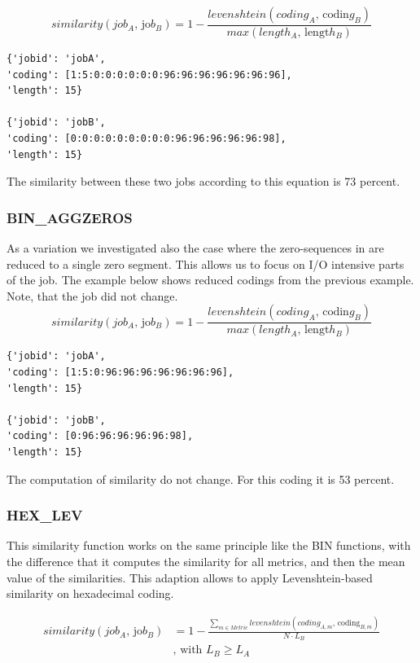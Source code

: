 \documentclass[]{llncs}
\begin{document}
\begin{equation}
similarity \left( job_{A}\text{, jo}b_{B} \right) =1- \frac{levenshtein \left( coding_{A}\text{, codin}g_{B} \right) }{max \left( length_{A}\text{, lengt}h_{B} \right) }
\end{equation}
\begin{lstlisting}
{'jobid': 'jobA',
'coding': [1:5:0:0:0:0:0:0:96:96:96:96:96:96:96],
'length': 15} 

{'jobid': 'jobB',
'coding': [0:0:0:0:0:0:0:0:0:96:96:96:96:96:98],
'length': 15}
\end{lstlisting}
The similarity between these two jobs according to this equation is 73 percent.

\subsubsection{BIN\_AGGZEROS}
As a variation we investigated also the case where the zero-sequences in are reduced to a single zero segment. This allows us to focus on I/O intensive parts of the job. The example below shows reduced codings from the previous example. Note, that the job did not change.
\begin{equation}
similarity \left( job_{A}\text{, jo}b_{B} \right) =1- \frac{levenshtein \left( coding_{A}\text{, codin}g_{B} \right) }{max \left( length_{A}\text{, lengt}h_{B} \right) }
\end{equation}

\begin{lstlisting}
{'jobid': 'jobA',
'coding': [1:5:0:96:96:96:96:96:96:96],
'length': 15}

{'jobid': 'jobB',
'coding': [0:96:96:96:96:96:98],
'length': 15}
\end{lstlisting}

The computation of similarity do not change.
For this coding it is 53 percent.
\subsubsection{HEX\_LEV}
This similarity function works on the same principle like the BIN functions, with the difference that it computes the similarity for all metrics, and then the mean value of the similarities.
This adaption allows to apply Levenshtein-based similarity on hexadecimal coding.

\begin{align}
  similarity \left( job_{A}\text{, jo}b_{B} \right) &= 1 -\frac{ \sum_{m \in Metric}^{} levenshtein \left( coding_{A,m}\text{, coding}_{B,m} \right) }{N \cdot L_{B}} \\
	&\text{, with }L_{B} \geq L_{A}
\end{align}
\end{document}
